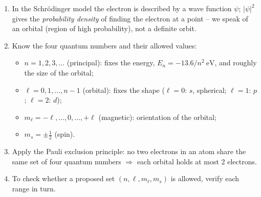 \documentclass[11pt]{article}
\newcommand{\cle}[1]{{\popxbold\color{popdark}#1}}
\begin{document}
\begin{methode}
\begin{enumerate}
\item In the Schr\"odinger model the electron is described by a \cle{wave function} $\psi$; $|\psi|^2$ gives the \emph{probability density} of finding the electron at a point -- we speak of an \cle{orbital} (region of high probability), not a definite orbit.
\item Know the four quantum numbers and their allowed values:
\begin{itemize}
\item $n = 1, 2, 3, \dots$ (principal): fixes the energy, $E_n = -13.6/n^2\ \mathrm{eV}$, and roughly the size of the orbital;
\item $\ell = 0, 1, \dots, n-1$ (orbital): fixes the shape ($\ell = 0$: $s$, spherical; $\ell = 1$: $p$; $\ell = 2$: $d$);
\item $m_\ell = -\ell, \dots, 0, \dots, +\ell$ (magnetic): orientation of the orbital;
\item $m_s = \pm\tfrac{1}{2}$ (spin).
\end{itemize}
\item Apply the \cle{Pauli exclusion principle}: no two electrons in an atom share the same set of four quantum numbers $\Rightarrow$ each orbital holds at most 2 electrons.
\item To check whether a proposed set $(n, \ell, m_\ell, m_s)$ is allowed, verify each range in turn.
\end{enumerate}
\end{methode}
\end{document}
